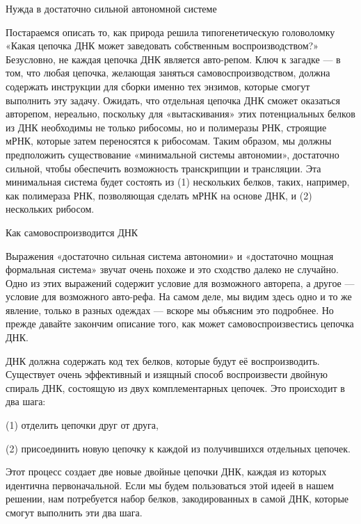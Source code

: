 \documentclass[../main.tex]{subfiles}
\begin{document}
Нужда в достаточно сильной автономной системе

Постараемся описать то, как природа решила типогенетическую головоломку «Какая цепочка ДНК может заведовать собственным воспроизводством?» Безусловно, не каждая цепочка ДНК является авто-репом. Ключ к загадке --- в том, что любая цепочка, желающая заняться самовоспроизводством, должна содержать инструкции для сборки именно тех энзимов, которые смогут выполнить эту задачу. Ожидать, что отдельная цепочка ДНК сможет оказаться авторепом, нереально, поскольку для «вытаскивания» этих потенциальных белков из ДНК необходимы не только рибосомы, но и полимеразы РНК, строящие мРНК, которые затем переносятся к рибосомам. Таким образом, мы должны предположить существование «минимальной системы автономии», достаточно сильной, чтобы обеспечить возможность транскрипции и трансляции. Эта минимальная система будет состоять из (1) нескольких белков, таких, например, как полимераза РНК, позволяющая сделать мРНК на основе ДНК, и (2) нескольких рибосом.

Как самовоспроизводится ДНК

Выражения «достаточно сильная система автономии» и «достаточно мощная формальная система» звучат очень похоже и это сходство далеко не случайно. Одно из этих выражений содержит условие для возможного авторепа, а другое --- условие для возможного авто-рефа. На самом деле, мы видим здесь одно и то же явление, только в разных одеждах --- вскоре мы объясним это подробнее. Но прежде давайте закончим описание того, как может самовоспроизвестись цепочка ДНК.

ДНК должна содержать код тех белков, которые будут её воспроизводить. Существует очень эффективный и изящный способ воспроизвести двойную спираль ДНК, состоящую из двух комплементарных цепочек. Это происходит в два шага:

(1) отделить цепочки друг от друга,

(2) присоединить новую цепочку к каждой из получившихся отдельных цепочек.

Этот процесс создает две новые двойные цепочки ДНК, каждая из которых идентична первоначальной. Если мы будем пользоваться этой идеей в нашем решении, нам потребуется набор белков, закодированных в самой ДНК, которые смогут выполнить эти два шага.
\end{document}
